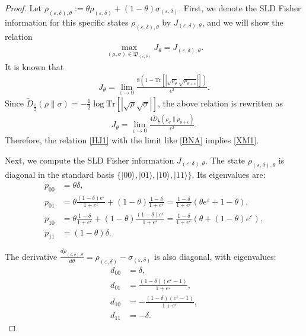 \documentclass[onecolumn,ldraftcls, 11pt]{IEEEtran}
\newcommand{\tr}{\mathrm{Tr}}
\newcommand{\nn}{\nonumber}
\newcommand{\eps}{\varepsilon}
\newcommand{\ket}[1]{|#1 \rangle}
\begin{document}
\begin{proof}
Let $\rho_{(\eps,\delta),\theta} := \theta \rho_{(\eps,\delta)} + (1-\theta)\sigma_{(\eps,\delta)}$. 
First, we denote the SLD Fisher information for 
this specific states $\rho_{(\eps,\delta),\theta}$ by $J_{(\eps,\delta),\theta}$, and 
we will show the relation
\begin{align}
\max_{(\rho,\sigma) \in \mathfrak{D}_{(\eps,\delta)}} J_\theta = 
J_{(\eps,\delta),\theta}.\label{XM1}
\end{align}
It is known that \cite[Theorem 6.3]{H2017QIT}
\begin{align}
J_\theta = \lim_{\epsilon\to 0} 
\frac{8(1- \tr [| \sqrt{\rho_\theta} \sqrt{\rho_{\theta+\epsilon}}|])}{\epsilon^2}.
\end{align}
Since $\check{D}_{\frac{1}{2}}(\rho\|\sigma)=-\frac{1}{2}
\log \tr [|\sqrt{\rho}\sqrt{\sigma}| ]$, the above relation is rewritten as
\begin{align}
J_\theta = \lim_{\epsilon\to 0} 
\frac{4 \check{D}_{\frac{1}{2}}( \rho_\theta\| \rho_{\theta+\epsilon})}{\epsilon^2}. \label{BNA}
\end{align}
Therefore, the relation \eqref{HJ1} with the limit like \eqref{BNA}
implies \eqref{XM1}.


Next, we compute the SLD Fisher information $J_{(\eps,\delta),\theta}$.
The state $\rho_{(\eps,\delta),\theta}$ is diagonal in the standard basis $\{\ket{00}, \ket{01}, \ket{10}, \ket{11}\}$. Its eigenvalues are:
\begin{align}
p_{00} &= \theta\delta, \nn\\
p_{01} &= \theta \frac{(1-\delta)e^\eps}{1+e^\eps} + (1-\theta)\frac{1-\delta}{1+e^\eps} = \frac{1-\delta}{1+e^\eps}(\theta e^\eps + 1-\theta), \nn\\
p_{10} &= \theta \frac{1-\delta}{1+e^\eps} + (1-\theta)\frac{(1-\delta)e^\eps}{1+e^\eps} = \frac{1-\delta}{1+e^\eps}(\theta + (1-\theta)e^\eps), \nn\\
p_{11} &= (1-\theta)\delta.\nn
\end{align}

The derivative $\frac{d\rho_{(\eps,\delta),\theta}}{d\theta} = \rho_{(\eps,\delta)} - \sigma_{(\eps,\delta)}$ is also diagonal, with eigenvalues:
\begin{align}
d_{00} &= \delta, \nn\\
d_{01} &= \frac{(1-\delta)(e^\eps-1)}{1+e^\eps}, \nn\\
d_{10} &= -\frac{(1-\delta)(e^\eps-1)}{1+e^\eps}, \nn\\
d_{11} &= -\delta.\nn
\end{align}


\end{proof}
\end{document}
